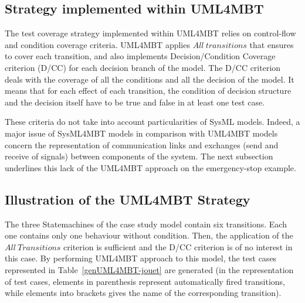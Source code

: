 \documentclass{llncs}
\begin{document}
\subsection{Strategy implemented within UML4MBT}

The test coverage strategy implemented within UML4MBT relies on
control-flow and condition coverage criteria. UML4MBT applies
$All~transitions$ that ensures to cover each transition, and also
implements  Decision/Condition Coverage criterion (D/CC) for each
decision branch of the model. The D/CC criterion deals with the
coverage of all the conditions and all the decision of the model. It
means that for each effect of each transition, the condition of
decision structure and the decision itself have to be true and false
in at least one test case.

These criteria do not take into account particularities of SysML
models. Indeed, a major issue of SysML4MBT models in
comparison with UML4MBT models concern the representation of
communication links and exchanges (send and receive of signals)
between components of the system. The next subsection underlines this
lack of the UML4MBT approach on the emergency-stop example.
\vspace*{-.4cm}

\subsection{Illustration of the UML4MBT Strategy}

The three Statemachines of the case study model contain six
transitions. Each one contains only one behaviour without
condition. Then, the application of the $All~Transitions$ criterion is 
sufficient and the D/CC criterion is of no interest in this case. 
By performing UML4MBT approach to this model, the test cases represented 
in Table~\ref{genUML4MBT-jouet} are generated (in the representation of
test cases, elements in parenthesis represent automatically fired
transitions, while elements into brackets gives the name of the
corresponding transition).
\end{document}
